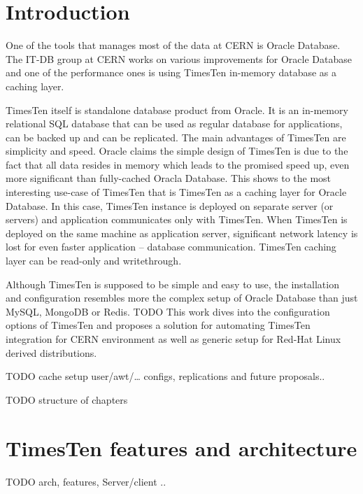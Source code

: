 \documentclass[11pt, letterpaper]{article}            %
\newcommand{\footrulecolor}[1]{\patchcmd{\footrule}{\hrule}{\color{#1}\hrule}{}{}} %
\begin{document}
{\fontsize{11}{13}\sffamily\linespread{1.750}\selectfont\tableofcontents}
\thispagestyle{fancy}\newpage

\fancyfoot{} %
\renewcommand{\footrulewidth}{0.4pt} %
\footrulecolor{linec}

\section{Introduction}
One of the tools that manages most of the data at CERN is Oracle Database. The IT-DB group at CERN works on various improvements for Oracle Database and one of the performance ones is using TimesTen in-memory database as a caching layer.

TimesTen itself is standalone database product from Oracle. It is an in-memory relational SQL database that can be used as regular database for applications, can be backed up and can be replicated. The main advantages of TimesTen are simplicity and speed. Oracle claims the simple design of TimesTen is due to the fact that all data resides in memory which leads to the promised speed up, even more significant than fully-cached Oracla Database. This shows to the most interesting use-case of TimesTen that is TimesTen as a caching layer for Oracle Database. In this case, TimesTen instance is deployed on separate server (or servers) and application communicates only with TimesTen. When TimesTen is deployed on the same machine as application server, significant network latency is lost for even faster application – database communication. TimesTen caching layer can be read-only and writethrough.

Although TimesTen is supposed to be simple and easy to use, the installation and configuration resembles more the complex setup of Oracle Database than just MySQL, MongoDB or Redis. TODO This work dives into the configuration options of TimesTen and proposes a solution for automating TimesTen integration for CERN environment as well as generic setup for Red-Hat Linux derived distributions.

TODO cache setup user/awt/… configs, replications and future proposals..

TODO structure of chapters

\section{TimesTen features and architecture}
TODO arch, features, Server/client ..
\end{document}
